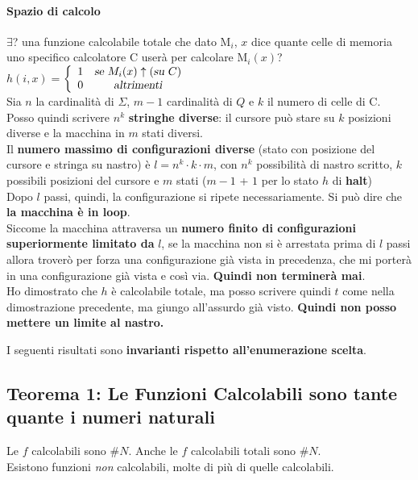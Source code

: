 \documentclass[10pt]{book}
\begin{document}
\paragraph{Spazio di calcolo} $\exists$? una funzione calcolabile totale che dato M$_i$, $x$ dice quante celle di memoria uno specifico calcolatore C userà per calcolare M$_i(x)$?\\
$h(i, x) = $\begin{math}
\left\{
\begin{array}{c c}
	1 & \textsl{se }M_i(x)\uparrow (\textsl{su }C)\\
	0 & \textsl{altrimenti}
\end{array}
\right.
\end{math}\\
Sia $n$ la cardinalità di $\Sigma$, $m - 1$ cardinalità di $Q$ e $k$ il numero di celle di C.\\
Posso quindi scrivere $n^k$ \textbf{stringhe diverse}: il cursore può stare su $k$ posizioni diverse e la macchina in $m$ stati diversi.\\
Il \textbf{numero massimo di configurazioni diverse} (stato con posizione del cursore e stringa su nastro) è  $l = n^k \cdot k \cdot m$, con $n^k$ possibilità di nastro scritto, $k$ possibili posizioni del cursore e $m$ stati ($m - 1$ + $1$ per lo stato $h$ di \textbf{halt})\\
Dopo $l$ passi, quindi, la configurazione si ripete necessariamente. Si può dire che \textbf{la macchina è in loop}.\\
Siccome la macchina attraversa un \textbf{numero finito di configurazioni superiormente limitato da} $l$, se la macchina non si è arrestata prima di $l$ passi allora troverò per forza una configurazione già vista in precedenza, che mi porterà in una configurazione già vista e così via. \textbf{Quindi non terminerà mai}.\\
Ho dimostrato che $h$ è calcolabile totale, ma posso scrivere quindi $t$ come nella dimostrazione precedente, ma giungo all'assurdo già visto. \textbf{Quindi non posso mettere un limite al nastro.}
\pagebreak

I seguenti risultati sono \textbf{invarianti rispetto all'enumerazione scelta}.
\subsection{Teorema 1: Le Funzioni Calcolabili sono tante quante i numeri naturali}
Le $f$ calcolabili sono \#$N$. Anche le $f$ calcolabili totali sono \#$N$.\\
Esistono funzioni \textit{non} calcolabili, molte di più di quelle calcolabili.
\end{document}
